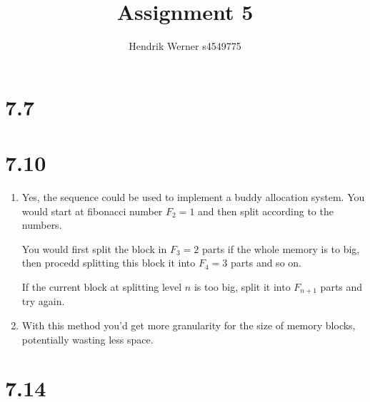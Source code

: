 \documentclass[12pt]{article}
\title{Assignment 5}
\author{Hendrik Werner s4549775}
\begin{document}
\maketitle

\section*{7.7}
\section*{7.10}
\begin{enumerate}[a]
	\item %
	Yes, the sequence could be used to implement a buddy allocation system. You would start at fibonacci number $F_2 = 1$ and then split according to the numbers.

	You would first split the block in $F_3 = 2$ parts if the whole memory is to big, then procedd splitting this block it into $F_4 = 3$ parts and so on.

	If the current block at splitting level $n$ is too big, split it into $F_{n + 1}$ parts and try again.

	\item %
	With this method you'd get more granularity for the size of memory blocks, potentially wasting less space.
\end{enumerate}

\section*{7.14}
\end{document}
